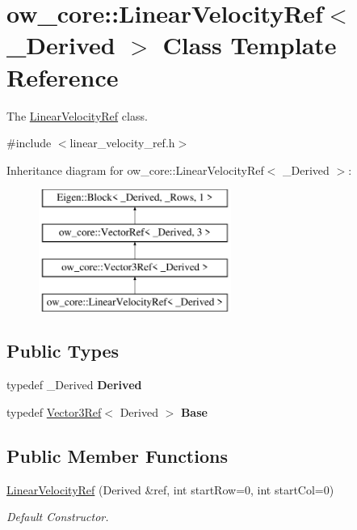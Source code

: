 \hypertarget{classow__core_1_1LinearVelocityRef}{}\section{ow\+\_\+core\+:\+:Linear\+Velocity\+Ref$<$ \+\_\+\+Derived $>$ Class Template Reference}
\label{classow__core_1_1LinearVelocityRef}


The \hyperlink{classow__core_1_1LinearVelocityRef}{Linear\+Velocity\+Ref} class.  




{\ttfamily \#include $<$linear\+\_\+velocity\+\_\+ref.\+h$>$}

Inheritance diagram for ow\+\_\+core\+:\+:Linear\+Velocity\+Ref$<$ \+\_\+\+Derived $>$\+:\begin{figure}[H]
\begin{center}
\leavevmode
\includegraphics[height=4.000000cm]{d8/d79/classow__core_1_1LinearVelocityRef}
\end{center}
\end{figure}
\subsection*{Public Types}
\begin{DoxyCompactItemize}
\item 
typedef \+\_\+\+Derived {\bfseries Derived}\hypertarget{classow__core_1_1LinearVelocityRef_a3ac3012d274d4ac8eb2a40737e0b47a7}{}\label{classow__core_1_1LinearVelocityRef_a3ac3012d274d4ac8eb2a40737e0b47a7}

\item 
typedef \hyperlink{classow__core_1_1Vector3Ref}{Vector3\+Ref}$<$ Derived $>$ {\bfseries Base}\hypertarget{classow__core_1_1LinearVelocityRef_a1b6b82ecd607a6461d9b752c35cf1b98}{}\label{classow__core_1_1LinearVelocityRef_a1b6b82ecd607a6461d9b752c35cf1b98}

\end{DoxyCompactItemize}
\subsection*{Public Member Functions}
\begin{DoxyCompactItemize}
\item 
\hyperlink{classow__core_1_1LinearVelocityRef_a78f241cf9a1105b927f6f04ed6fa5d11}{Linear\+Velocity\+Ref} (Derived \&ref, int start\+Row=0, int start\+Col=0)
\begin{DoxyCompactList}\small\item\em Default Constructor. \end{DoxyCompactList}\end{DoxyCompactItemize}


